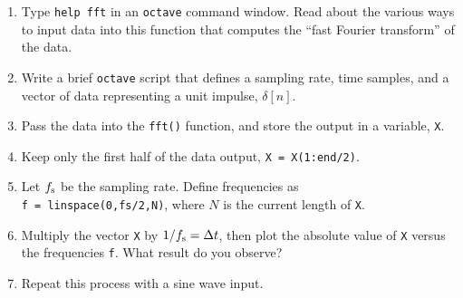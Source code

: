 \documentclass{article}
\begin{document}
\begin{enumerate}
\item Type \verb+help fft+ in an \verb+octave+ command window.  Read about the various ways to input data into this function that computes the ``fast Fourier transform'' of the data.
\item Write a brief \verb+octave+ script that defines a sampling rate, time samples, and a vector of data representing a unit impulse, $\delta[n]$.
\item Pass the data into the \verb+fft()+ function, and store the output in a variable, \verb+X+.
\item Keep only the first half of the data output, \verb+X = X(1:end/2)+.
\item Let $f_{\rm s}$ be the sampling rate.  Define frequencies as \\ \verb+f = linspace(0,fs/2,N)+, where $N$ is the current length of \verb+X+.
\item Multiply the vector \verb+X+ by $1/f_{\rm s} = \Delta t$, then plot the absolute value of \verb+X+ versus the frequencies \verb+f+. What result do you observe?
\item Repeat this process with a sine wave input.
\end{enumerate}
\end{document}

